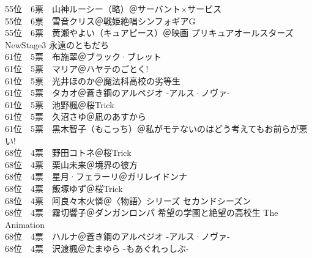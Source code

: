 {    55位　6票　山神ルーシー（略）＠サーバント×サービス                                                   \\
    55位　6票　雪音クリス＠戦姫絶唱シンフォギアG                                                          \\
    55位　6票　黄瀬やよい（キュアピース）＠映画 プリキュアオールスターズNewStage3 永遠のともだち          \\
    61位　5票　布施翠＠ブラック·ブレット                                                                 \\
    61位　5票　マリア＠ハヤテのごとく!                                                                    \\
    61位　5票　光井ほのか＠魔法科高校の劣等生                                                             \\
    61位　5票　タカオ＠蒼き鋼のアルペジオ -アルス·ノヴァ-                                                \\
    61位　5票　池野楓＠桜Trick                                                                            \\
    61位　5票　久沼さゆ＠凪のあすから                                                                     \\
    61位　5票　黒木智子（もこっち）＠私がモテないのはどう考えてもお前らが悪い!                            \\
    68位　4票　野田コトネ＠桜Trick                                                                        \\
    68位　4票　栗山未来＠境界の彼方                                                                       \\
    68位　4票　星月·フェラーリ＠ガリレイドンナ                                                           \\
    68位　4票　飯塚ゆず＠桜Trick                                                                          \\
    68位　4票　阿良々木火憐＠〈物語〉シリーズ セカンドシーズン                                            \\
    68位　4票　霧切響子＠ダンガンロンパ 希望の学園と絶望の高校生 The Animation                            \\
    68位　4票　ハルナ＠蒼き鋼のアルペジオ -アルス·ノヴァ-                                                \\
    68位　4票　沢渡楓＠たまゆら -もあぐれっしぶ-                                                          \\
}
